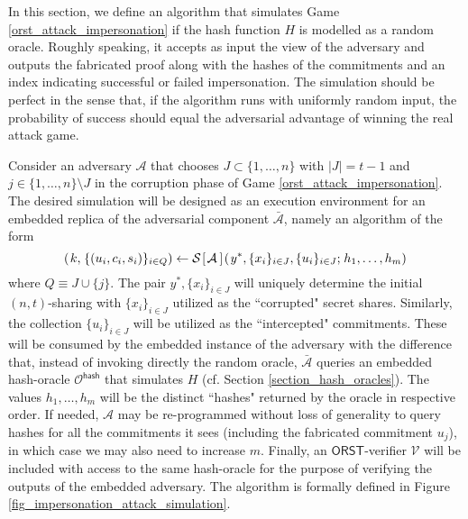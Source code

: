 \documentclass[psamsfonts, reqno]{amsart}
\theoremstyle{definition}
\theoremstyle{remark}
\numberwithin{equation}{section}
\begin{document}
In this section, we define an algorithm that
simulates Game \ref{orst_attack_impersonation}
if the hash function $H$ is modelled as a random oracle.
Roughly speaking, it accepts as input
the view of the adversary and outputs
the fabricated proof along with
the hashes of the commitments and an index indicating
successful or failed impersonation.
The simulation should be perfect in the sense that,
if the algorithm runs with uniformly random input,
the probability of success should equal the adversarial advantage of
winning the real attack game.

Consider an adversary $\mathcal{A}$
that chooses $J \subset \{1, \dots, n\}$ with $|J| = t-1$
and $j \in \{1, \dots, n\} \setminus J$ in the
corruption phase of Game \ref{orst_attack_impersonation}.
The desired simulation will be designed as
an execution environment for an embedded replica of
the adversarial component $\mathcal{\bar{A}}$,
namely an algorithm of the form
\vspace{5pt}
\begin{equation*}
	(
		\hspace{1pt}k,
		\hspace{1pt}
		\{(u_i, c_i, s_i)\}_{i \in Q}
	) \leftarrow
	\mathcal{S}
		\hspace{1pt}[
			\hspace{1pt}\mathcal{A}
		\hspace{2pt}]
		\hspace{1pt}
		(
			\hspace{1pt}
			y ^*,
			\{x_i\}_{i \in J},
			\{u_i\}_{i \in J};
			\hspace{1pt}
			h_1, \dots, h_m
		)
\vspace{5pt}
\end{equation*}
where $Q \equiv J \cup \{j\}$.
The pair $y ^*, \{x_i\}_{i \in J}$ will uniquely determine the
initial $(n, t)$-sharing with $\{x_i\}_{i \in J}$
utilized as the ``corrupted" secret shares.
Similarly, the collection $\{u_i\}_{i \in J}$
will be utilized as the ``intercepted" commitments.
These will be consumed by the embedded instance of
the adversary with the difference that,
instead of invoking directly the random oracle,
$\mathcal{\bar{A}}$ queries an embedded hash-oracle
$\mathcal{O}^{\mathsf{hash}}$ that simulates $H$
(cf. Section \ref{section_hash_oracles}).
The values $h_1, \dots, h_m$ will be the distinct ``hashes"
returned by the oracle in respective order.
If needed, $\mathcal{A}$ may be re-programmed
without loss of generality to query hashes
for all the commitments it sees
(including the fabricated commitment $u_j$),
in which case we may also need to increase $m$.
Finally, an $\mathsf{ORST}$-verifier $\mathcal{V}$
will be included with access to the same hash-oracle for the
purpose of verifying the outputs of the embedded adversary.
The algorithm is formally defined in
Figure \ref{fig_impersonation_attack_simulation}.
\end{document}
